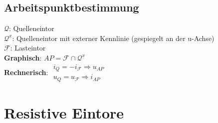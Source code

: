 \documentclass[fs, footer]{latex4ei}
\begin{document}
\begin{multicols*}{4}
{        \subsection{Arbeitspunktbestimmung}
        $\mathcal Q$: Quelleneintor\\
        $\mathcal Q^x$: Quelleneintor mit externer Kennlinie (gespiegelt an der u-Achse)\\
        $\mathcal F$: Lasteintor\\
        \textbf{Graphisch}: $AP = \mathcal F \cap \mathcal Q^x$\\
        \textbf{Rechnerisch}:
        $\begin{array}{l}
                i_Q = -i_{\mathcal F} \Rightarrow u_{AP} \\
                u_Q = u_{\mathcal F} \Rightarrow i_{AP}
            \end{array}$
    }

    \section{Resistive Eintore}


\end{multicols*}
\end{document}
